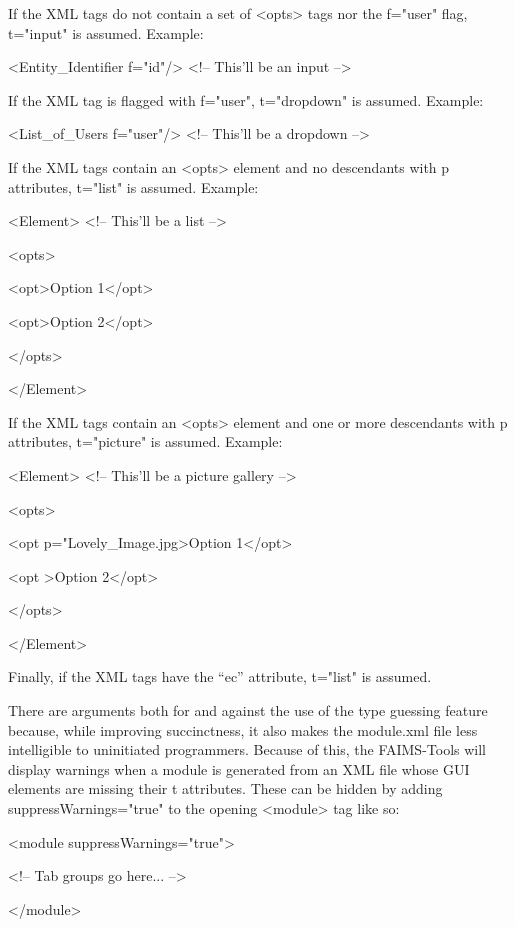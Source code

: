 If the XML tags do not contain a set of <opts> tags nor the f="user" flag, t="input" is assumed. Example:

<Entity_Identifier f="id"/> <!-- This'll be an input -->

If the XML tag is flagged with f="user", t="dropdown" is assumed. Example:

<List_of_Users f="user"/> <!-- This'll be a dropdown -->

If the XML tags contain an <opts> element and no descendants with p attributes, t="list" is assumed. Example:

<Element> <!-- This'll be a list -->

<opts>

<opt>Option 1</opt>

<opt>Option 2</opt>

</opts>

</Element>

If the XML tags contain an <opts> element and one or more descendants with p attributes, t="picture" is assumed. Example:

<Element> <!-- This'll be a picture gallery -->

<opts>

<opt p="Lovely_Image.jpg>Option 1</opt>

<opt >Option 2</opt>

</opts>

</Element>

Finally, if the XML tags have the “ec” attribute, t="list" is assumed.

There are arguments both for and against the use of the type guessing feature because, while improving succinctness, it also makes the module.xml file less intelligible to uninitiated programmers. Because of this, the FAIMS-Tools will display warnings when a module is generated from an XML file whose GUI elements are missing their t attributes. These can be hidden by adding suppressWarnings="true" to the opening <module> tag like so:

<module suppressWarnings="true">

<!-- Tab groups go here... -->

</module>




